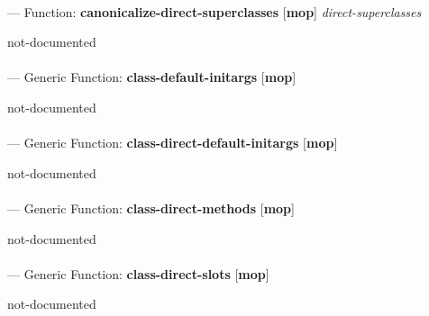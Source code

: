 \paragraph{}
\label{MOP:CANONICALIZE-DIRECT-SUPERCLASSES}
--- Function: \textbf{canonicalize-direct-superclasses} [\textbf{mop}] \textit{direct-superclasses}

\begin{adjustwidth}{5em}{5em}
not-documented
\end{adjustwidth}

\paragraph{}
\label{MOP:CLASS-DEFAULT-INITARGS}
--- Generic Function: \textbf{class-default-initargs} [\textbf{mop}] \textit{}

\begin{adjustwidth}{5em}{5em}
not-documented
\end{adjustwidth}

\paragraph{}
\label{MOP:CLASS-DIRECT-DEFAULT-INITARGS}
--- Generic Function: \textbf{class-direct-default-initargs} [\textbf{mop}] \textit{}

\begin{adjustwidth}{5em}{5em}
not-documented
\end{adjustwidth}

\paragraph{}
\label{MOP:CLASS-DIRECT-METHODS}
--- Generic Function: \textbf{class-direct-methods} [\textbf{mop}] \textit{}

\begin{adjustwidth}{5em}{5em}
not-documented
\end{adjustwidth}

\paragraph{}
\label{MOP:CLASS-DIRECT-SLOTS}
--- Generic Function: \textbf{class-direct-slots} [\textbf{mop}] \textit{}

\begin{adjustwidth}{5em}{5em}
not-documented
\end{adjustwidth}

